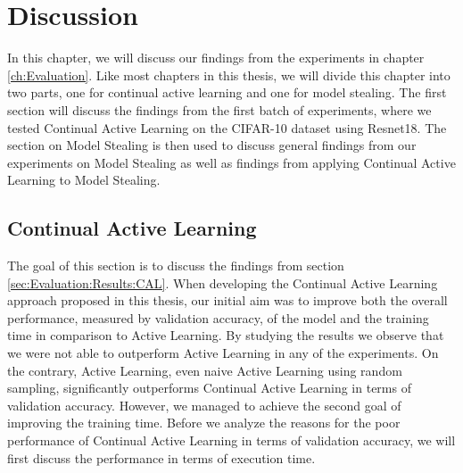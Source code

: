 
\chapter{Discussion}
\label{ch:Discussion}
In this chapter, we will discuss our findings from the experiments in chapter \ref{ch:Evaluation}. Like most chapters in this thesis, we will divide
this chapter into two parts, one for continual active learning and one for model stealing. The first section will discuss the findings from the first
batch of experiments, where we tested Continual Active Learning on the CIFAR-10 dataset using Resnet18. The section on Model Stealing is then used to
discuss general findings from our experiments on Model Stealing as well as findings from applying Continual Active Learning to Model Stealing. 

\section{Continual Active Learning}
\label{sec:Discussion:ContinualActiveLearning}
The goal of this section is to discuss the findings from section \ref{sec:Evaluation:Results:CAL}. When developing the Continual Active Learning
approach proposed in this thesis, our initial aim was to improve both the overall performance, measured by validation accuracy, of the model and the
training time in comparison to Active Learning. By studying the results we observe that we were not able to outperform Active Learning in any of the
experiments. On the contrary, Active Learning, even naive Active Learning using random sampling, significantly outperforms Continual Active Learning
in terms of validation accuracy. However, we managed to achieve the second goal of improving the training time. Before we analyze the reasons for the
poor performance of Continual Active Learning in terms of validation accuracy, we will first discuss the performance in terms of execution time.


